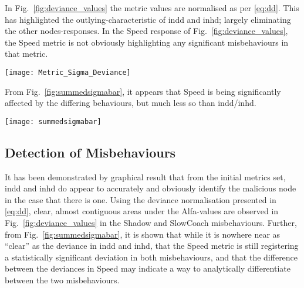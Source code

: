 \begin{comment}
\begin{figure*}
  \centering
  \texttt{[image: Metric\_Deviation]}
  \caption{\emph{Unnecessary but included for draft discussion} Observed Metric Values for one simulation of each behaviour ($d_{i,j}^{m,t}$ from Fig.~\ref{fig:workflow})}
\end{figure*}
\end{comment}

In Fig.~\ref{fig:deviance_values} the metric values are normalised as per \autoref{eq:dd}.
This has highlighted the outlying-characteristic of \gls{indd} and \gls{inhd}; largely eliminating the other nodes-responses.
In the Speed response of Fig.~\ref{fig:deviance_values}, the Speed metric is not obviously highlighting any significant misbehaviours in that metric. 

\begin{figure*}
  \centering
  \texttt{[image: Metric\_Sigma\_Deviance]}
  \caption{Normalised Deviance values from one simulation of each behaviour ($\alpha_{i,j}^{m,t}$ from \autoref{eq:dd})}
  \label{fig:deviance_values}
\end{figure*}

From Fig.~\ref{fig:summedsigmabar}, it appears that Speed is being significantly affected by the differing behaviours, but much less so than \gls{indd}/\gls{inhd}.  

\begin{figure*}
  \centering
  \texttt{[image: summedsigmabar]}
  \caption{Per-Node-Per-Run deviance for each metric, normalised in time ($\sum\alpha/T$)}
  \label{fig:summedsigmabar}
\end{figure*}

\subsection{Detection of Misbehaviours}
It has been demonstrated by graphical result that from the initial metrics set, \gls{indd} and \gls{inhd} do appear to accurately and obviously identify the malicious node in the case that there is one. 
Using the deviance normalisation presented in \autoref{eq:dd}, clear, almost contiguous areas under the Alfa-values are observed in Fig.~\ref{fig:deviance_values} in the Shadow and SlowCoach misbehaviours.
Further, from Fig.~\ref{fig:summedsigmabar}, it is shown that while it is nowhere near as ``clear'' as the deviance in \gls{indd} and \gls{inhd}, that the Speed metric is still registering a statistically significant deviation in both misbehaviours, and that the difference between the deviances in Speed may indicate a way to analytically differentiate between the two misbehaviours.

